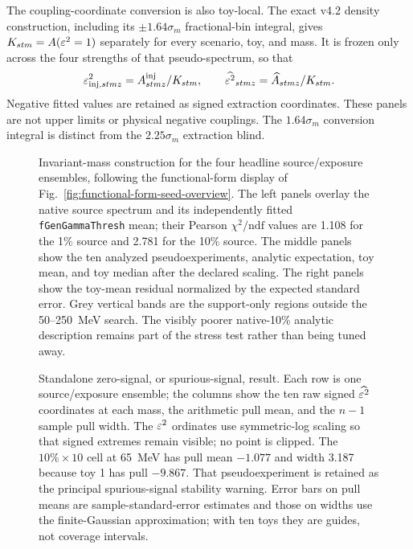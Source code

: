{The coupling-coordinate conversion is also toy-local.  The exact v4.2 density
construction, including its $\pm1.64\sigma_m$ fractional-bin integral, gives
$K_{stm}=A(\varepsilon^2=1)$ separately for every scenario, toy, and mass.  It is frozen
only across the four strengths of that pseudo-spectrum, so that
\begin{equation}
 \varepsilon^2_{\mathrm{inj},stmz}=A^{\mathrm{inj}}_{stmz}/K_{stm},
 \qquad
 \widehat{\varepsilon^2}_{stmz}=\widehat A_{stmz}/K_{stm}.
 \label{eq:v4p5-eps2-coordinate}
\end{equation}
Negative fitted values are retained as signed extraction coordinates.  These panels
are not upper limits or physical negative couplings.  The $1.64\sigma_m$ conversion
integral is distinct from the $2.25\sigma_m$ extraction blind.

\begin{figure}[p]
\centering
{}
\caption{Invariant-mass construction for the four headline source/exposure
ensembles, following the functional-form display of
Fig.~\ref{fig:functional-form-seed-overview}.
The left panels overlay the native source spectrum and its independently fitted
\texttt{fGenGammaThresh} mean; their Pearson $\chi^2/\mathrm{ndf}$ values are 1.108
for the 1\% source and 2.781 for the 10\% source.  The middle panels show the ten
analyzed pseudoexperiments, analytic expectation, toy mean, and toy median after the
declared scaling.  The right panels show the toy-mean residual normalized by the
expected standard error.  Grey vertical bands are the support-only regions outside
the 50--250~MeV search.  The visibly poorer native-10\% analytic description remains
part of the stress test rather than being tuned away.}
\label{fig:v4p5-functional-form-exposure-distributions}
\end{figure}

\begin{figure}[p]
\centering
{}
\caption{Standalone zero-signal, or spurious-signal, result.  Each row is one
source/exposure ensemble; the columns show the ten raw signed
$\widehat{\varepsilon^2}$ coordinates at each mass, the arithmetic pull mean, and the
$n-1$ sample pull width.  The $\varepsilon^2$ ordinates use symmetric-log scaling so that
signed extremes remain visible; no point is clipped.  The $10\%\times10$ cell at
65~MeV has pull mean $-1.077$ and width 3.187 because toy 1 has pull $-9.867$.
That pseudoexperiment is retained as the principal spurious-signal stability
warning.  Error bars on pull means are sample-standard-error estimates and those on
widths use the finite-Gaussian approximation; with ten toys they are guides, not
coverage intervals.}
\label{fig:v4p5-zero-signal-spurious}
\end{figure}

}
